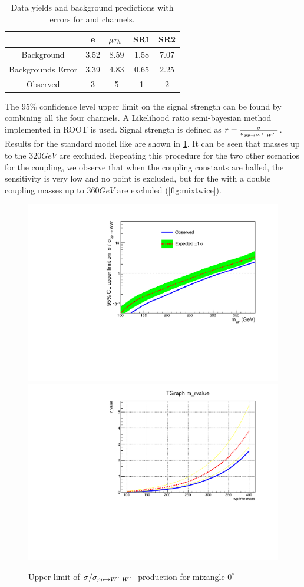 \begin{table}[htb]
	\centering
	\begin{tabular}{|c|c|c|c|c|}
		\hline 
		\wprime  &e\Tau &  $\mu\tau_h~$ & \tauTau SR1 & \tauTau SR2 \\
		\hline 
	         Background &3.52&8.59&1.58&7.07\\     
		 Backgrounds Error& 3.39&4.83&0.65&2.25\\
		 Observed& 3&5&1&2\\
		
		\hline
	\end{tabular}
	\caption{Data yields and background predictions with errors for \lepTau and \tauTau channels. \label{tab:yields} }
\end{table}

The 95\% confidence level upper limit on the signal strength can be found by combining all the four channels. A Likelihood ratio semi-bayesian method implemented in ROOT \cite{Brun:1997pa} is used. Signal strength is defined as $r = \frac{ \sigma }{\sigma_{pp \to W^\prime~W^\prime~} }$. Results for the standard model like \wprime are shown in \ref{fig:mix0}. It can be seen that \wprime masses up to the $320GeV$ are excluded.  Repeating this procedure for the two other scenarios for the coupling, we observe that when the coupling constants are halfed, the sensitivity is very low and no point is excluded, but for the \wprime with a double coupling masses up to $360GeV$ are excluded (\ref{fig:mixtwice}).


\begin{figure}[!ht]
\centering
\includegraphics*[width=.45\textwidth]{figs/mix0b.pdf}
\hspace{3mm}
\includegraphics*[width=.45\textwidth]{figs/mix0.pdf}
\caption{Upper limit of $\sigma/\sigma_{pp \rightarrow W^\prime~ W^\prime~}$ production for mixangle $0^\circ$ }
\label{fig:mix0}
\end{figure}
 

